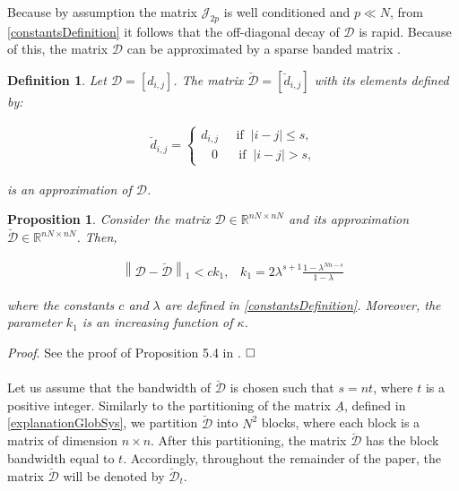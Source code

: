 \documentclass[journal,10pt]{IEEEtran}
\newtheorem{definition}[thm]{Definition}
\newtheorem{proposition}[thm]{Proposition}
\begin{document}
Because by assumption the matrix $\mathcal{J}_{2p}$ is well conditioned and $p\ll N$, from \eqref{constantsDefinition} it follows that the off-diagonal decay of $\mathcal{D}$ is rapid. Because of this, the matrix $\mathcal{D}$ can be approximated by a sparse banded matrix \cite{benzi2007}. \\
\begin{definition} \cite{benzi2007} Let $\mathcal{D}=[d_{i,j}]$. The matrix $\breve{\mathcal{D}}=[\breve{d}_{i,j}]$ with its elements defined by:
\begin{small}
\begin{align}
\breve{d}_{i,j}=\left\{ \begin{array}{ll}
    d_{i,j} \;\;\; \;\; \text{if} \; \; |i-j|\le s \textrm{,} \\
 \;\;\; 0  \;\; \;\;\;\; \text{if} \; \; |i-j|> s \textrm{,} 
   \end{array} \right.
\label{blockApproximation2}
\end{align}
\end{small}
is an approximation of $\mathcal{D}$.
\label{blockBandedDefinition} \\
\end{definition}
\begin{proposition}
Consider the matrix $\mathcal{D}\in \mathbb{R}^{nN\times nN}$ and its approximation $\breve{\mathcal{D}}\in \mathbb{R}^{nN\times nN} $. Then,
\begin{small}
\begin{align}
\left\|\mathcal{D}-\breve{\mathcal{D}}\right\|_{1} < c k_{1},\;\;\; k_{1}=2\lambda^{s+1} \frac{1-\lambda^{Nn-s}}{1-\lambda} 
\label{boundOnApproximation} 
\end{align}
\end{small}
where the constants $c$ and $\lambda$ are defined in \eqref{constantsDefinition}. Moreover, the parameter $k_{1}$ is an increasing function of $\kappa$.
\label{blockBandedApprox}
\end{proposition} 
\textit{Proof}. See the proof of Proposition 5.4 in \cite{haberThesis}.
$\hfill \square$ \\ \\
 Let us assume that the bandwidth of  $\breve{\mathcal{D}}$ is chosen such that $s=nt$, where $t$ is a positive integer. Similarly to the partitioning of the matrix $\underline{A}$, defined in \eqref{explanationGlobSys}, we partition $\breve{\mathcal{D}}$ into $N^{2}$ blocks, where each block is a matrix of dimension $n\times n$. After this partitioning, the matrix $\breve{\mathcal{D}}$ has the block bandwidth equal to $t$. Accordingly, throughout the remainder of the paper, the matrix $\breve{\mathcal{D}}$ will be denoted by $\breve{\mathcal{D}}_{t}$.
\end{document}
